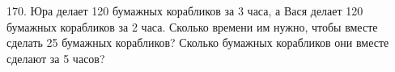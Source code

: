 170. Юра делает 120 бумажных корабликов за 3 часа, а Вася делает 120 бумажных корабликов за 2 часа. Сколько времени им нужно, чтобы вместе сделать 25 бумажных корабликов? Сколько бумажных корабликов они вместе сделают за 5 часов?\\
